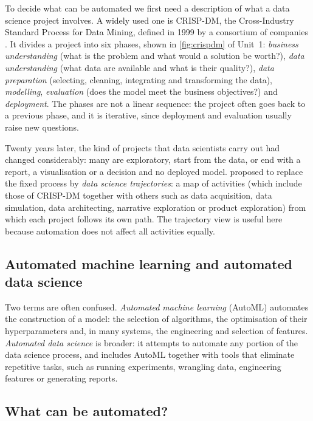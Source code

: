 To decide what can be automated we first need a description of what a data science project
involves. A widely used one is CRISP-DM, the Cross-Industry Standard Process for Data
Mining, defined in 1999 by a consortium of companies \citep{chapman2000crisp,wirth2000crisp}. It
divides a project into six phases, shown in \cref{fig:crispdm} of Unit~1: \emph{business understanding} (what is the
problem and what would a solution be worth?), \emph{data understanding} (what data are available
and what is their quality?), \emph{data preparation} (selecting, cleaning, integrating and
transforming the data), \emph{modelling}, \emph{evaluation} (does the model meet the business
objectives?) and \emph{deployment}. The phases are not a linear sequence: the
project often goes back to a previous phase, and it is iterative, since deployment and evaluation
usually raise new questions.

Twenty years later, the kind of projects that data scientists carry out had changed considerably:
many are exploratory, start from the data, or end with a report, a visualisation or a decision and no deployed model. \citet{martinezplumed2021crisp} proposed
to replace the fixed process by \emph{data science trajectories}: a map of activities (which include
those of CRISP-DM together with others such as data acquisition, data simulation, data architecting,
narrative exploration or product exploration) from which each project follows its own path. The
trajectory view is useful here because automation does not affect all activities equally.

\subsection{Automated machine learning and automated data science}

Two terms are often confused. \emph{Automated machine learning} (AutoML) automates the construction of
a model: the selection of algorithms, the optimisation of their hyperparameters and, in many systems,
the engineering and selection of features. \emph{Automated data science} is broader: it attempts to
automate any portion of the data science process, and includes AutoML together with tools that
eliminate repetitive tasks, such as running experiments, wrangling data, engineering features or
generating reports.

\subsection{What can be automated?}

